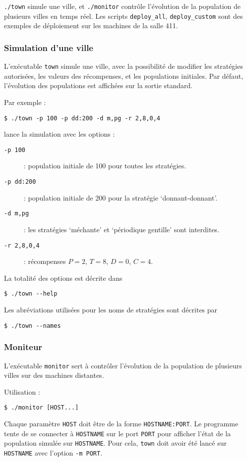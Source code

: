 \documentclass[10pt]{article}
\begin{document}
\verb|./town| simule une ville, et \verb|./monitor| contrôle l'évolution de la population de plusieurs villes en temps réel.
Les scripts \verb|deploy_all|, \verb|deploy_custom| sont des exemples de déploiement sur les machines de la salle 411.

\subsubsection{Simulation d'une ville}
L'exécutable \verb|town| simule une ville, avec la possibilité de modifier les stratégies autorisées,
les valeurs des récompenses, et les populations initiales. Par défaut, l'évolution des populations
est affichées sur la sortie standard.

Par exemple :
\begin{verbatim}
$ ./town -p 100 -p dd:200 -d m,pg -r 2,8,0,4
\end{verbatim}
lance la simulation avec les options :
\begin{description}
\item[\tt{-p 100}] : population initiale de 100 pour toutes les stratégies.
\item[\tt{-p dd:200}] : population initiale de 200 pour la stratégie `donnant-donnant'.
\item[\tt{-d m,pg}] : les stratégies `méchante' et `périodique gentille' sont interdites.
\item[\tt{-r 2,8,0,4}] : récompenses $P=2$, $T=8$, $D=0$, $C=4$.
\end{description}

La totalité des options est décrite dans
\begin{verbatim}
$ ./town --help
\end{verbatim}

Les abréviations utilisées pour les noms de stratégies sont décrites par
\begin{verbatim}
$ ./town --names
\end{verbatim}

\subsubsection{Moniteur}
L'exécutable \verb|monitor| sert à contrôler l'évolution de la population de plusieurs villes sur des machines distantes.

Utilisation :
\begin{verbatim}
$ ./monitor [HOST...]
\end{verbatim}
Chaque paramètre \verb|HOST| doit être de la forme \verb|HOSTNAME:PORT|.
Le programme tente de se connecter à \verb|HOSTNAME| sur le port \verb|PORT| pour afficher l'état de la population simulée sur \verb|HOSTNAME|.
Pour cela, \verb|town| doit avoir été lancé sur \verb|HOSTNAME| avec l'option \verb|-m PORT|.
\end{document}
